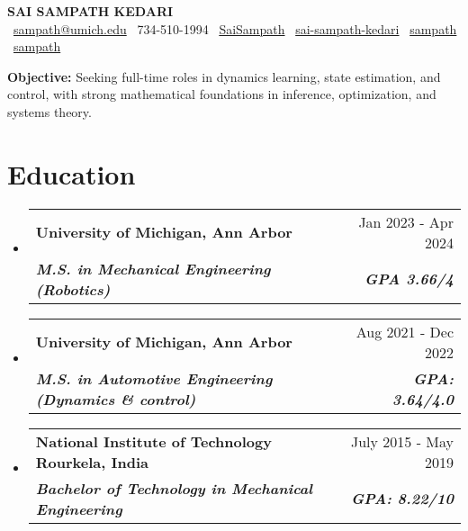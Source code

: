 \documentclass[letterpaper,11pt]{article}
\makeatletter
\newcommand{\resumeSubheading}[4]{
  \vspace{-2pt}\item
    \begin{tabular*}{0.97\textwidth}[t]{l@{\extracolsep{\fill}}r}
      \textbf{#1} & #2 \\
      \textit{\small#3} & \textit{\small #4} \\
    \end{tabular*}\vspace{-7pt}
}
\newcommand{\resumeSubHeadingListStart}{\begin{itemize}[leftmargin=0.15in, label={}]}
\newcommand{\resumeSubHeadingListEnd}{\end{itemize}}
\makeatother
\begin{document}

\begin{center}
    {\LARGE \textbf{SAI SAMPATH KEDARI}}\\[0.5ex]
    \small
    \faEnvelope~\href{mailto:sampath@umich.edu}{sampath@umich.edu} \quad
    \faPhone~734-510-1994 \quad
    \faGlobe~\href{https://saisampathkedari.github.io}{SaiSampath} \quad
    \faLinkedin~\href{https://linkedin.com/in/sai-sampath-kedari}{sai-sampath-kedari} \quad
    \faGithub~\href{https://github.com/SaiSampathKedari}{sampath} \quad
    \faTwitter~\href{https://x.com/SSampathKedari}{sampath}
\end{center}

\noindent\small\textbf{Objective:} Seeking full-time roles in dynamics learning, state estimation, and control, with strong mathematical foundations in inference, optimization, and systems theory.

\section{Education}
  \resumeSubHeadingListStart
    \resumeSubheading
      {University of Michigan, Ann Arbor}{Jan 2023 - Apr 2024}
      {\bf M.S. in Mechanical Engineering (Robotics)}{ \bf GPA 3.66/4}
    \resumeSubheading
      {University of Michigan, Ann Arbor}{Aug 2021 - Dec 2022}
      {\bf M.S. in Automotive Engineering (Dynamics \& control)}
      {\bf GPA: 3.64/4.0}
    \resumeSubheading
      {National Institute of Technology Rourkela, India}{July 2015 - May 2019}
      {\bf Bachelor of Technology in Mechanical Engineering}
      {\bf GPA: 8.22/10}

  \resumeSubHeadingListEnd
\end{document}
